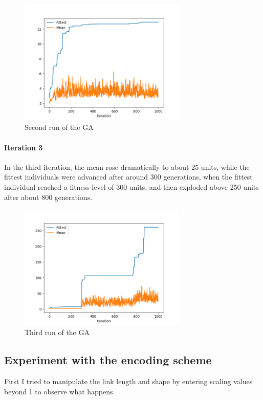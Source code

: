 \begin{figure}[H]
    \centering
    \includegraphics[width=8cm]{test2}
    \caption{Second run of the GA}
    \label{fig:ga2}
\end{figure}

\paragraph{Iteration 3} In the third iteration, the mean rose dramatically to about 25 units, while the fittest individuals were advanced after around 300 generations, when the fittest individual reached a fitness level of 300 units, and then exploded above 250 units after about 800 generations.

\begin{figure}[H]
    \centering
    \includegraphics[width=8cm]{test3}
    \caption{Third run of the GA}
    \label{fig:ga3}
\end{figure}

\subsection{Experiment with the encoding scheme}

First I tried to manipulate the link length and shape by entering scaling values beyond 1 to observe what happens.

